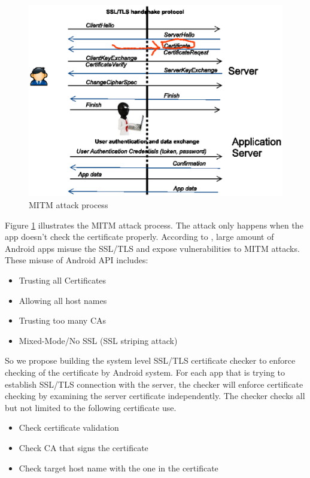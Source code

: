 \documentclass[a4paper, 12pt]{article}
\begin{document}
\begin{figure}[!htb]
\centering
\includegraphics[scale=.5]{imgs/mitm_attack}
\caption{MITM attack process}
\label{fig:mitm}
\end{figure}
Figure \ref{fig:mitm} illustrates the MITM attack process. The attack only happens when the app doesn't check the 
certificate properly. According to \cite{fahl2012eve}, large amount of Android apps misuse the SSL/TLS and expose vulnerabilities to MITM attacks. These misuse of Android API includes:
\begin{itemize}
\item  Trusting all Certificates
\item Allowing all host names
\item Trusting too many CAs
\item Mixed-Mode/No SSL (SSL striping attack)
\end{itemize}
So we propose building the system level SSL/TLS certificate checker to enforce checking of the certificate by Android system.
For each app that is trying to establish SSL/TLS connection with the server, the checker will enforce certificate 
checking by examining the server certificate independently. The checker checks all but not limited to the following certificate use.
\begin{itemize}
\item Check certificate validation
\item Check CA that signs the certificate
\item Check target host name with the one in the certificate
\end{itemize}
\end{document}
